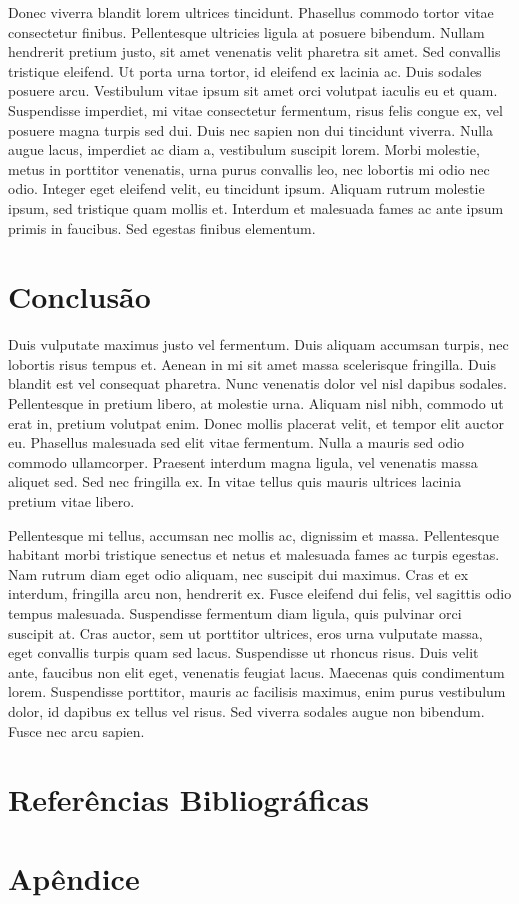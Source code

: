 \documentclass[final,12pt,times,twocolumn,authoryear]{elsarticle}
\begin{document}
Donec viverra blandit lorem ultrices tincidunt. Phasellus commodo tortor vitae consectetur finibus. Pellentesque ultricies ligula at posuere bibendum. Nullam hendrerit pretium justo, sit amet venenatis velit pharetra sit amet. Sed convallis tristique eleifend. Ut porta urna tortor, id eleifend ex lacinia ac. Duis sodales posuere arcu. Vestibulum vitae ipsum sit amet orci volutpat iaculis eu et quam. Suspendisse imperdiet, mi vitae consectetur fermentum, risus felis congue ex, vel posuere magna turpis sed dui. Duis nec sapien non dui tincidunt viverra. Nulla augue lacus, imperdiet ac diam a, vestibulum suscipit lorem. Morbi molestie, metus in porttitor venenatis, urna purus convallis leo, nec lobortis mi odio nec odio. Integer eget eleifend velit, eu tincidunt ipsum. Aliquam rutrum molestie ipsum, sed tristique quam mollis et. Interdum et malesuada fames ac ante ipsum primis in faucibus. Sed egestas finibus elementum. 







\section{Conclusão}
 Duis vulputate maximus justo vel fermentum. Duis aliquam accumsan turpis, nec lobortis risus tempus et. Aenean in mi sit amet massa scelerisque fringilla. Duis blandit est vel consequat pharetra. Nunc venenatis dolor vel nisl dapibus sodales. Pellentesque in pretium libero, at molestie urna. Aliquam nisl nibh, commodo ut erat in, pretium volutpat enim. Donec mollis placerat velit, et tempor elit auctor eu. Phasellus malesuada sed elit vitae fermentum. Nulla a mauris sed odio commodo ullamcorper. Praesent interdum magna ligula, vel venenatis massa aliquet sed. Sed nec fringilla ex. In vitae tellus quis mauris ultrices lacinia pretium vitae libero.

Pellentesque mi tellus, accumsan nec mollis ac, dignissim et massa. Pellentesque habitant morbi tristique senectus et netus et malesuada fames ac turpis egestas. Nam rutrum diam eget odio aliquam, nec suscipit dui maximus. Cras et ex interdum, fringilla arcu non, hendrerit ex. Fusce eleifend dui felis, vel sagittis odio tempus malesuada. Suspendisse fermentum diam ligula, quis pulvinar orci suscipit at. Cras auctor, sem ut porttitor ultrices, eros urna vulputate massa, eget convallis turpis quam sed lacus. Suspendisse ut rhoncus risus. Duis velit ante, faucibus non elit eget, venenatis feugiat lacus. Maecenas quis condimentum lorem. Suspendisse porttitor, mauris ac facilisis maximus, enim purus vestibulum dolor, id dapibus ex tellus vel risus. Sed viverra sodales augue non bibendum. Fusce nec arcu sapien. 




\section*{Referências Bibliográficas}


\section*{Apêndice}

    
\end{document}
